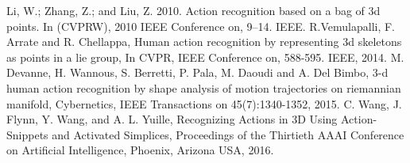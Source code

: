 \documentclass[letterpaper, 10 pt, conference]{ieeeconf}  %
\begin{document}
\begin{thebibliography}{99}
Li, W.; Zhang, Z.; and Liu, Z. 2010. Action recognition
based on a bag of 3d points. In (CVPRW), 2010 IEEE Conference
on, 9–14. IEEE.
 R.Vemulapalli, F. Arrate  and R. Chellappa, Human action recognition by representing 3d skeletons as points in a lie group, In CVPR, IEEE Conference on, 588-595. IEEE, 2014.
 M. Devanne, H. Wannous, S. Berretti, P. Pala, M. Daoudi  and A. Del Bimbo, 3-d human action recognition by shape analysis of motion trajectories on riemannian manifold, Cybernetics, IEEE Transactions on 45(7):1340-1352, 2015.
 C. Wang, J. Flynn, Y. Wang, and A. L. Yuille, Recognizing Actions in 3D Using Action-Snippets and Activated Simplices, Proceedings of the Thirtieth AAAI Conference on Artificial Intelligence, Phoenix, Arizona USA, 2016.

%

\end{thebibliography}
\end{document}
